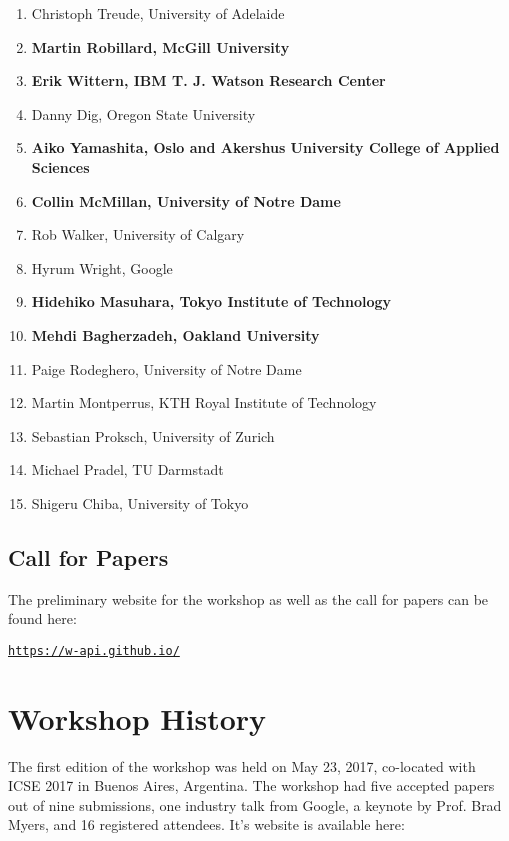 \documentclass[sigconf]{acmart}
\newcommand{\updated}[1]{#1}
\begin{document}
\begin{enumerate}
\setlength\itemsep{5pt}
\item Christoph Treude, University of Adelaide
\item \textbf{Martin Robillard, McGill University}
\item \textbf{Erik Wittern, IBM T. J. Watson Research Center}
\item Danny Dig, Oregon State University
\item \textbf{Aiko Yamashita, Oslo and Akershus University College of Applied Sciences}
\item \textbf{Collin McMillan, University of Notre Dame}
\item Rob Walker, University of Calgary
\item Hyrum Wright, Google
\item \textbf{Hidehiko Masuhara, Tokyo Institute of Technology}
\item \textbf{Mehdi Bagherzadeh, Oakland University}
\item Paige Rodeghero, University of Notre Dame
\item Martin Montperrus, KTH Royal Institute of Technology
\item Sebastian Proksch, University of Zurich
\item Michael Pradel, TU Darmstadt
\item Shigeru Chiba, University of Tokyo
\end{enumerate}

\subsection{Call for Papers}
The preliminary website for the workshop as well as the call for papers can be found here:

\begin{center}
  \texttt{\url{https://w-api.github.io/}}
\end{center}

\section{Workshop History}

\updated{The first edition of the workshop was held on May 23, 2017, co-located with ICSE 2017 in Buenos Aires, Argentina. The workshop had five accepted papers out of nine submissions, one industry talk from Google, a keynote by Prof. Brad Myers, and 16 registered attendees. It's website is available here:}
\end{document}
